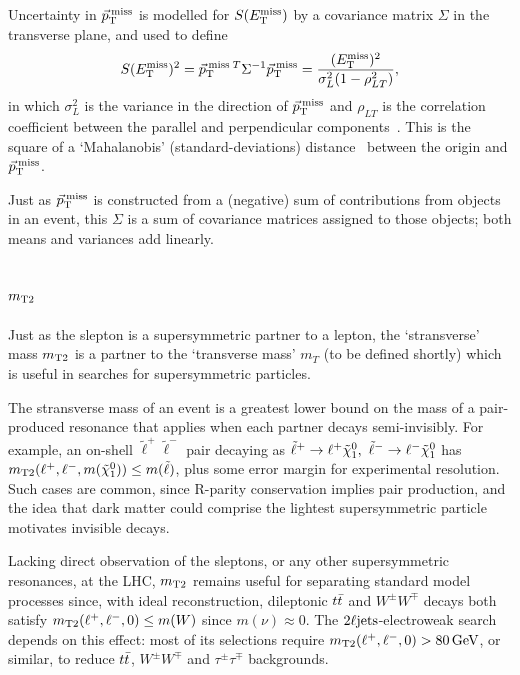 Uncertainty in $\ptmiss$ is modelled for $\metsig$ by a covariance matrix
$\Sigma$ in the transverse plane, and used to define
\begin{equation}
\metsig^2
=
\ptmiss\,{}^T \Sigma^{-1} \ptmiss
=
\frac{(\met)^2}{\sigma_L^2(1 - \rho_{LT}^2)}
,
\end{equation}
in which $\sigma_L^2$ is the variance in the direction of $\ptmiss$ and
$\rho_{LT}$ is the correlation coefficient between the parallel and
perpendicular components~\cite{atlas_met_significance}.
This is the square of a `Mahalanobis' (standard-deviations)
distance~\cite{mahalanobis1936generalised} between the origin and $\ptmiss$.

Just as $\ptmiss$ is constructed from a (negative) sum of contributions from
objects in an event, this $\Sigma$ is a sum of covariance matrices assigned to
those objects; both means and variances add linearly.


\subsection{\texorpdfstring{$\mttwo$}{mT2}}
\label{sec:2ljets_mt2}
Just as the slepton is a supersymmetric partner to a lepton, the `stransverse'
mass $\mttwo$ is a partner to the `transverse mass' $m_T$
(to be defined shortly)
which is useful in searches for supersymmetric particles.

The stransverse mass of an event is a greatest lower bound on the mass of a
pair-produced resonance that applies when each partner decays semi-invisibly.
For example, an on-shell $\tilde\ell^+\tilde\ell^-$ pair decaying as
$\tilde\ell^+ \to \ell^+ \neutralino_1
,~
\tilde\ell^- \to \ell^- \neutralino_1$ has
$\mttwo(\ell^+, \ell^-, m(\neutralino_1)) \leq m(\tilde\ell)$, plus some error
margin for experimental resolution.
Such cases are common, since R-parity conservation implies pair production,
and the idea that dark matter could comprise the lightest supersymmetric
particle motivates invisible decays.

Lacking direct observation of the sleptons, or any other supersymmetric
resonances, at the LHC, $\mttwo$ remains useful for separating standard model
processes since, with ideal reconstruction,
dileptonic $\ttbar$ and $W^\pm W^\mp$ decays both
satisfy $\mttwo(\ell^+, \ell^-, 0) \leq m(W)$ since $m(\nu) \approx 0$.
The $\twoljets$-electroweak search depends on this effect:
most of its selections require $\mttwo(\ell^+, \ell^-, 0) > 80\,\eV[G]$,
or similar,
to reduce $\ttbar$, $W^\pm W^\mp$ and $\tau^\pm\tau^\mp$ backgrounds.


